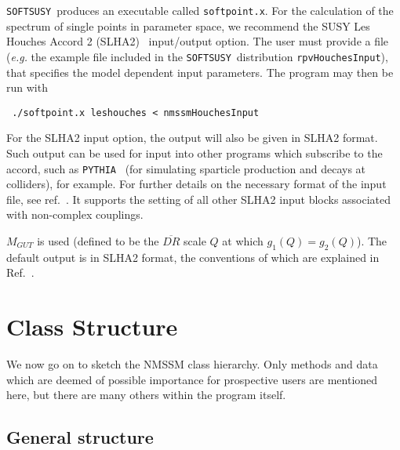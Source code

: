 \documentclass[final,3p,times,pdflatex]{elsarticle}
\def\SOFTSUSY{{\tt SOFTSUSY}}
\def\code#1{\small{\tt #1}\normalsize}
\begin{document}
\SOFTSUSY~produces an executable called \code{softpoint.x}. For the calculation
of the spectrum of single points in parameter space, we recommend the
SUSY Les Houches Accord 2 (SLHA2)~\cite{Allanach:2008qq}  input/output
option. The user must provide a file (\textit{e.g.} the example file included
in the \SOFTSUSY~distribution
\code{rpvHouchesInput}), that specifies the model dependent input
parameters. The program may then be run with
\small
\begin{verbatim}
 ./softpoint.x leshouches < nmssmHouchesInput
\end{verbatim}
\normalsize
For the SLHA2 input option, 
the output will also be given in 
SLHA2 format. Such output can be used for
input into other programs which subscribe to the accord, such as
\code{PYTHIA}~\cite{Sjostrand:2007gs} (for
simulating sparticle production and decays at colliders), for example. For
further details on the necessary format of 
the input file, see ref.~\cite{Allanach:2008qq}. It supports 
the setting of all other SLHA2 input blocks associated with non-complex
couplings. 

$M_{GUT}$ is used (defined to be the $\overline{DR}$ scale $Q$ at which $g_1(Q) =
g_2(Q)$). The default output is in SLHA2 format, the conventions of which are
explained in Ref.~\cite{Allanach:2008qq}. 


\section{Class Structure\label{sec:objects}}

We now go on to sketch the NMSSM class hierarchy.  Only methods and
data which are deemed of possible importance for prospective users are
mentioned here, but there are many others within the program itself.


\subsection{General structure}
\end{document}
